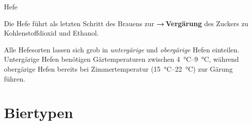 \documentclass[9pt, ngerman]{beamer}
\newcommand{\forward}[1]{\textbf{→\,#1}}
\begin{document}
\begin{frame}{Hefe}

  Die Hefe führt als letzten Schritt des Brauens zur \forward{Vergärung} des
  Zuckers zu Kohlenstoffdioxid und Ethanol.

  Alle Hefesorten lassen sich grob in \emph{untergärige} und \emph{obergärige}
  Hefen einteilen. Untergärige Hefen benötigen Gärtemperaturen zwischen
  \SIrange{4}{9}{\celsius}, während obergärige Hefen bereits bei
  Zimmertemperatur (\SIrange{15}{22}{\celsius}) zur Gärung führen.

\end{frame}

\section{Biertypen}
\end{document}
